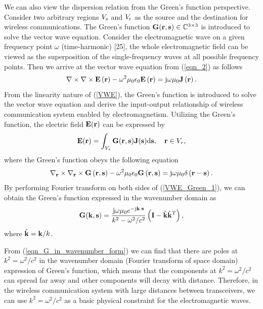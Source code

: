 \documentclass[a4paper,12pt]{article}
\begin{document}
\begin{framed}
{	\quad We can also view the dispersion relation from the Green's function perspective. Consider two arbitrary regions $V_{\rm s}$ and $V_{\rm r}$ as the source and the destination for wireless communications. The Green's function ${\bf{G}} ({\bf{r}},{\bf{s}})\in \mathbb{C}^{3\times 3}$ is introduced to solve the vector wave equation. Consider the electromagnetic wave on a given frequency point $\omega$ (time-harmonic) [25], the whole electromagnetic field can be viewed as the superposition of the single-frequency waves at all possible frequency points. Then we arrive at the vector wave equation from (\ref{eqn_2}) as follows
	\begin{equation}
		\nabla  \times \nabla  \times {\bf{E}}\left( {\bf{r}} \right) - {\omega ^2 \mu_0 \epsilon_0}{\bf{E}}\left( {\bf{r}} \right) = {\rm j}\omega {\mu _0}{\bf{J}}\left( {\bf{r}} \right).
		\label{VWE}
	\end{equation}
	From the linearity nature of (\ref{VWE}), the Green's function is introduced to solve the vector wave equation and derive the input-output relationship of wireless communication system enabled by electromagnetism. 
	Utilizing the Green's function, the electric field ${\bf{E}}({\bf{r}})$ can be expressed by  
	\begin{equation}
		{\bf{E}}({\bf{r}}) = \int_{{V_s}} {\bf{G}} ({\bf{r}},{\bf{s}}){\bf{J}}({\bf{s}}){\rm d}{\bf{s}},\quad {\bf{r}} \in {V_r},
		\label{VWE_Green}
	\end{equation}
	where the Green's function obeys the following equation
	\begin{equation}
		\nabla_{\bf r}  \times \nabla_{\bf r}  \times {\bf{G}}\left( {\bf{r}},{\bf {s}} \right) - {\omega ^2 \mu_0 \epsilon_0}{\bf{G}}\left( {\bf{r}},{\bf {s}} \right) = {\rm j}\omega {\mu _0}\delta\left( {\bf{r}}-{\bf {s}} \right).
		\label{VWE_Green_1}
	\end{equation}
	By performing Fourier transform on both sides of (\ref{VWE_Green_1})\cite{poon2005degrees}, we can obtain the Green's function expressed in the wavenumber domain as 
	\begin{equation}
		{\bf G}({\bf k},{\bf s}) = \frac{{\rm j}\omega\mu_0 e^{-{\rm j}{\bf k}\cdot {\bf s}}}{k^2-\omega^2/c^2}\left({\bf I} - \hat{\bf k}\hat{\bf k}^{\rm T}  \right),
		\label{eqn_G_in_wavenumber_form}
	\end{equation}
	where $\hat{\bf k} = {\bf k}/k$.
	
	\quad From (\ref{eqn_G_in_wavenumber_form}) we can find that there are poles at $k^2 = \omega^2/c^2$ in the wavenumber domain (Fourier transform of space domain) expression of Green's function, which means that the components at $k^2 = \omega^2/c^2$ can spread far away and other components will decay with distance. Therefore, in the wireless communication system with large distances between transceivers, we can use $k^2 = \omega^2/c^2$ as a basic physical constraint for the electromagnetic waves. 
	
}
\end{framed}
\end{document}

